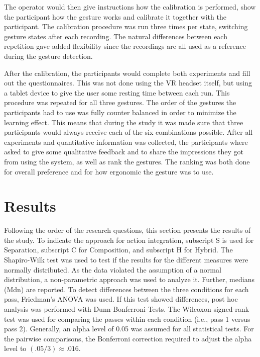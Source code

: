 The operator would then give instructions how the calibration is performed, show the participant how the gesture works and calibrate it together with the participant. The calibration procedure was run three times per state, switching gesture states after each recording. The natural differences between each repetition gave added flexibility since the recordings are all used as a reference during the gesture detection.

After the calibration, the participants would complete both experiments and fill out the questionnaires. This was not done using the VR headset itself, but using a tablet device to give the user some resting time between each run. This procedure was repeated for all three gestures. 
The order of the gestures the participants had to use was fully counter balanced in order to minimize the learning effect. This means that during the study it was made sure that three participants would always receive each of the six combinations possible. 
After all experiments and quantitative information was collected, the participants where asked to give some qualitative feedback and to share the impressions they got from using the system, as well as rank the gestures. The ranking was both done for overall preference and for how ergonomic the gesture was to use.   


\section{Results}
Following the order of the research questions, this section presents the results of the study. To
indicate the approach for action integration, subscript S is used for Separation, subscript C for
Composition, and subscript H for Hybrid. The Shapiro-Wilk test was used to test if the results
for the different measures were normally distributed. As the data violated the assumption of a
normal distribution, a non-parametric approach was used to analyze it. Further, medians (Mdn) are
reported. To detect differences between the three conditions for each pass, Friedman’s ANOVA was
used. If this test showed differences, post hoc analysis was performed with Dunn-Bonferroni-Tests.
The Wilcoxon signed-rank test was used for comparing the passes within each condition (i.e., pass
1 versus pass 2). Generally, an alpha level of 0.05 was assumed for all statistical tests. For the
pairwise comparisons, the Bonferroni correction required to adjust the alpha level to $(.05/3) \approx .016$.

